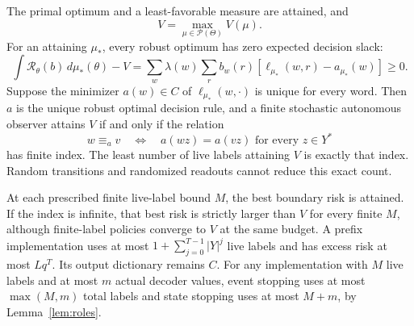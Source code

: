 \begin{theorem}\label{thm:boundary-regularity}
The primal optimum and a least-favorable measure are attained, and
\begin{equation}\label{eq:boundary-minimax}
 V=\max_{\mu\in\mathcal P(\Theta)}V(\mu).
\end{equation}
For an attaining $\mu_*$, every robust optimum has zero expected decision slack:
\begin{equation}\label{eq:boundary-slack}
 \int\mathcal R_\theta(b)\,d\mu_*(\theta)-V
 =\sum_w\lambda(w)\sum_r b_w(r)
          [\ell_{\mu_*}(w,r)-a_{\mu_*}(w)]\ge0.
\end{equation}
Suppose the minimizer $a(w)\in C$ of $\ell_{\mu_*}(w,\cdot)$ is unique for every word. Then $a$ is the unique robust optimal decision rule, and a finite stochastic autonomous observer attains $V$ if and only if the relation
\begin{equation}\label{eq:decision-congruence}
 w\equiv_a v\quad\Longleftrightarrow\quad
          a(wz)=a(vz)\text{ for every }z\in Y^*
\end{equation}
has finite index. The least number of live labels attaining $V$ is exactly that index. Random transitions and randomized readouts cannot reduce this exact count.

At each prescribed finite live-label bound $M$, the best boundary risk is attained. If the index is infinite, that best risk is strictly larger than $V$ for every finite $M$, although finite-label policies converge to $V$ at the same budget. A prefix implementation uses at most
$1+\sum_{j=0}^{T-1}|Y|^j$ live labels and has excess risk at most $Lq^T$. Its output dictionary remains $C$. For any implementation with $M$ live labels and at most $m$ actual decoder values, event stopping uses at most $\max(M,m)$ total labels and state stopping uses at most $M+m$, by Lemma~\ref{lem:roles}.
\end{theorem}
